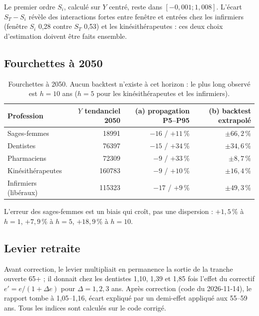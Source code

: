 \documentclass[11pt]{article}
\begin{document}
Le premier ordre $S_i$, calculé sur $Y$ centré, reste dans $[-0{,}001 ; 1{,}008]$\mesure{}. L'écart
$S_T - S_i$ révèle des interactions fortes entre fenêtre et entrées chez les infirmiers (fenêtre $S_i$ 0,28 contre
$S_T$ 0,53\mesure{}) et les kinésithérapeutes : ces deux choix d'estimation doivent être faits ensemble.

\subsection{Fourchettes à 2050}
\begin{table}[h]\centering\small
\begin{tabular}{lrrr}
\toprule
Profession & $Y$ tendanciel 2050 & (a) propagation P5--P95 & (b) backtest extrapolé \\
\midrule
Sages-femmes & \num{18991}\mesure{} & $-16$ / $+11$\,\%\mesure{} & $\pm 66{,}2$\,\%\derive{} \\
Dentistes & \num{76397}\mesure{} & $-15$ / $+34$\,\%\mesure{} & $\pm 34{,}6$\,\%\derive{} \\
Pharmaciens & \num{72309}\mesure{} & $-9$ / $+33$\,\%\mesure{} & $\pm 8{,}7$\,\%\derive{} \\
Kinésithérapeutes & \num{160783}\mesure{} & $-9$ / $+10$\,\%\mesure{} & $\pm 16{,}4$\,\%\derive{} \\
Infirmiers (libéraux) & \num{115323}\mesure{} & $-17$ / $+9$\,\%\mesure{} & $\pm 49{,}3$\,\%\derive{} \\
\bottomrule
\end{tabular}
\caption{Fourchettes à 2050. Aucun backtest n'existe à cet horizon : le plus long observé est $h = 10$ ans
($h = 5$ pour les kinésithérapeutes et les infirmiers).}\label{tab:band}
\end{table}

L'erreur des sages-femmes est un biais qui croît, pas une dispersion : $+1{,}5$\,\%\mesure{} à $h = 1$,
$+7{,}9$\,\%\mesure{} à $h = 5$, $+18{,}9$\,\%\mesure{} à $h = 10$.

\subsection{Levier retraite}
Avant correction, le levier multipliait en permanence la sortie de la tranche ouverte 65+ ; il donnait chez les
dentistes 1,10, 1,39 et 1,85\mesure{} fois l'effet du correctif $e' = e/(1+\Delta e)$ pour $\Delta = 1, 2, 3$ ans.
Après correction (code du 2026-11-14), le rapport tombe à 1,05--1,16\mesure{}, écart expliqué par un demi-effet
appliqué aux 55--59 ans. Tous les indices sont calculés sur le code corrigé.
\end{document}
